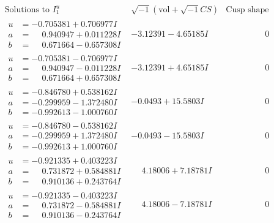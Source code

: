 \documentclass[1p]{elsarticle_modified}
\theoremstyle{definition}
\newcommand{\I}{\sqrt{-1}}
\begin{document}
$$\begin{array}{c|c|c}  
\text{Solutions to }I^u_{1}& \I (\text{vol} + \sqrt{-1}CS) & \text{Cusp shape}\\
 \hline 
\begin{aligned}
u &= -0.705381 + 0.706977 I \\
a &= \phantom{-}0.940947 + 0.011228 I \\
b &= \phantom{-}0.671664 - 0.657308 I\end{aligned}
 & -3.12391 - 4.65185 I & \phantom{-0.000000 } 0 \\ \hline\begin{aligned}
u &= -0.705381 - 0.706977 I \\
a &= \phantom{-}0.940947 - 0.011228 I \\
b &= \phantom{-}0.671664 + 0.657308 I\end{aligned}
 & -3.12391 + 4.65185 I & \phantom{-0.000000 } 0 \\ \hline\begin{aligned}
u &= -0.846780 + 0.538162 I \\
a &= -0.299959 - 1.372480 I \\
b &= -0.992613 - 1.000760 I\end{aligned}
 & -0.0493 + 15.5803 I & \phantom{-0.000000 } 0 \\ \hline\begin{aligned}
u &= -0.846780 - 0.538162 I \\
a &= -0.299959 + 1.372480 I \\
b &= -0.992613 + 1.000760 I\end{aligned}
 & -0.0493 - 15.5803 I & \phantom{-0.000000 } 0 \\ \hline\begin{aligned}
u &= -0.921335 + 0.403223 I \\
a &= \phantom{-}0.731872 + 0.584881 I \\
b &= \phantom{-}0.910136 + 0.243764 I\end{aligned}
 & \phantom{-}4.18006 + 7.18781 I & \phantom{-0.000000 } 0 \\ \hline\begin{aligned}
u &= -0.921335 - 0.403223 I \\
a &= \phantom{-}0.731872 - 0.584881 I \\
b &= \phantom{-}0.910136 - 0.243764 I\end{aligned}
 & \phantom{-}4.18006 - 7.18781 I & \phantom{-0.000000 } 0 \\ \hline\begin{aligned}

\end{aligned}
\end{array}$$
\end{document}
